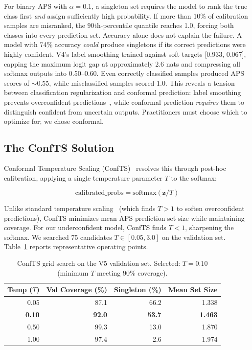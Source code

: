 For binary APS with $\alpha = 0.1$, a singleton set requires the model to rank the true class first \emph{and} assign sufficiently high probability. If more than 10\% of calibration samples are misranked, the 90th-percentile quantile reaches 1.0, forcing both classes into every prediction set. Accuracy alone does not explain the failure.
A model with 74\% accuracy \emph{could} produce singletons if its correct
predictions were highly confident.
V4's label smoothing trained against soft targets [0.933, 0.067], capping
the maximum logit gap at approximately 2.6 nats and compressing all softmax
outputs into 0.50--0.60.
Even correctly classified samples produced APS scores of $\sim$0.55, while
misclassified samples scored 1.0.
This reveals a tension between classification regularization and conformal
prediction: label smoothing prevents overconfident predictions~\cite{guocalibration2017},
while conformal prediction \emph{requires} them to distinguish confident
from uncertain outputs.
Practitioners must choose which to optimize for; we chose conformal.

\subsection{The ConfTS Solution}

Conformal Temperature Scaling (ConfTS)~\cite{dabah2024} resolves this through post-hoc calibration, applying a single temperature parameter $T$ to the softmax:

\begin{equation}
    \text{calibrated\_probs} = \text{softmax}(\mathbf{z} / T)
    \label{eq:ch4-confts}
\end{equation}

Unlike standard temperature scaling~\cite{guocalibration2017} (which finds $T > 1$ to soften overconfident predictions), ConfTS minimizes mean APS prediction set size while maintaining coverage. For our underconfident model, ConfTS finds $T < 1$, sharpening the softmax. We searched 75 candidates $T \in [0.05, 3.0]$ on the validation set. Table~\ref{tab:confts-grid} reports representative operating points.

\begin{table}[H]
\centering
\small
\caption{ConfTS grid search on the V5 validation set. Selected: $T = 0.10$ (minimum $T$ meeting 90\% coverage).}
\label{tab:confts-grid}
\begin{tabular}{@{}rrrr@{}}
\toprule
\textbf{Temp ($T$)} & \textbf{Val Coverage (\%)} & \textbf{Singleton (\%)} & \textbf{Mean Set Size} \\
\midrule
0.05 & 87.1 & 66.2 & 1.338 \\
\textbf{0.10} & \textbf{92.0} & \textbf{53.7} & \textbf{1.463} \\
0.50 & 99.3 & 13.0 & 1.870 \\
1.00 & 97.4 & 2.6 & 1.974 \\
\bottomrule
\end{tabular}
\end{table}

